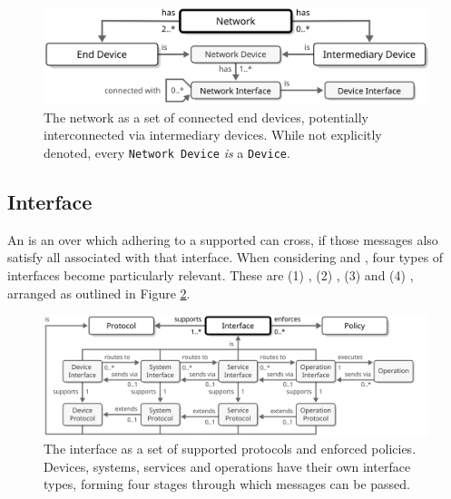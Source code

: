 \vfill

\begin{figure}[ht!]
  \centering
  \includegraphics[scale=0.9]{figures/network}
  \caption{
    The network as a set of connected end devices, potentially interconnected via intermediary devices.
    While not explicitly denoted, every \texttt{Network Device} \textit{is} a \texttt{Device}.
  }
  \label{fig:network}
\end{figure}

\vspace*{-6mm}

\subsection{Interface}
\label{sec:concepts:interface}

An  is an   over which  adhering to a supported  can cross, if those messages also satisfy all  associated with that interface.
When considering   and , four types of interfaces become particularly relevant.
These are (1) , (2) , (3)  and (4) , arranged as outlined in Figure \ref{fig:interface}.

\vfill

\begin{figure}[ht!]
  \centering
  \includegraphics[scale=0.9]{figures/interface}
  \caption{
    The interface as a set of supported protocols and enforced policies.
    Devices, systems, services and operations have their own interface types, forming four stages through which messages can be passed.
  }
  \label{fig:interface}
\end{figure}

